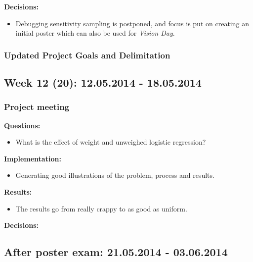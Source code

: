 \documentclass[11pt, a4paper]{article} %
\begin{document}
\textbf{Decisions:}\\
\begin{itemize}
\item Debugging sensitivity sampling is postponed, and focus is put on creating an initial poster which can also be used for \emph{Vision Day}.
\end{itemize}

\subsubsection*{Updated Project Goals and Delimitation}

\subsection*{Week 12 (20): 12.05.2014 - 18.05.2014}
\subsubsection*{Project meeting}
\textbf{Questions:}\\
\begin{itemize}
\item What is the effect of weight and unweighed logistic regression?
\end{itemize}

\textbf{Implementation:}\\
\begin{itemize}
\item Generating good illustrations of the problem, process and results.
\end{itemize}

\textbf{Results:}\\
\begin{itemize}
\item The results go from really crappy to as good as uniform.
\end{itemize}

\textbf{Decisions:}\\


\subsection*{After poster exam: 21.05.2014 - 03.06.2014}
\end{document}
